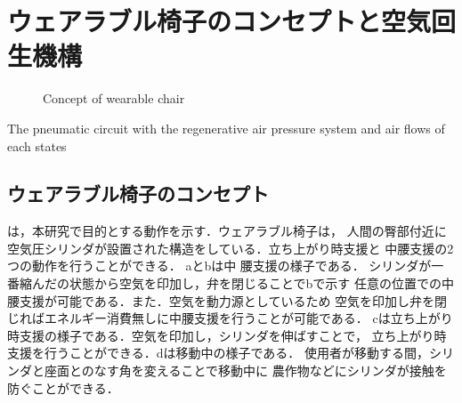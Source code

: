 \section{ウェアラブル椅子のコンセプトと空気回生機構}
\begin{figure}[h]%
        \begin{center}%
         \caption{Concept of wearable chair}%
        \end{center}%
       \end{figure}%
    
    {The pneumatic circuit with the regenerative air
    pressure system  and air flows of each states}
\subsection{ウェアラブル椅子のコンセプト}
は，本研究で目的とする動作を示す．ウェアラブル椅子は，
人間の臀部付近に空気圧シリンダが設置された構造をしている．立ち上がり時支援と
中腰支援の2つの動作を行うことができる．
aとbは中
腰支援の様子である．
シリンダが一番縮んだの状態から空気を印加し，弁を閉じることでbで示す
任意の位置での中腰支援が可能である．また．空気を動力源としているため
空気を印加し弁を閉じればエネルギー消費無しに中腰支援を行うことが可能である．
cは立ち上がり時支援の様子である．空気を印加し，シリンダを伸ばすことで，
立ち上がり時支援を行うことができる．dは移動中の様子である．
使用者が移動する間，シリンダと座面とのなす角を変えることで移動中に
農作物などにシリンダが接触を防ぐことができる．
